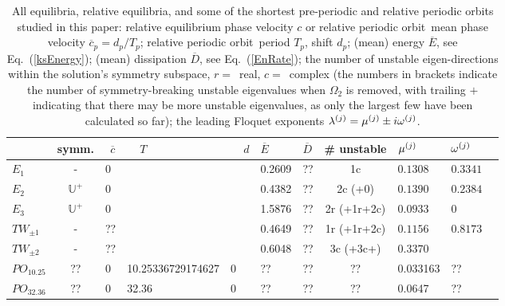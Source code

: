 \documentclass[aip,cha,showpacs,reprint]{revtex4-1} %
\newcommand{\refeq}  [1] {Eq.~(\ref{#1})}                   %
\newcommand{\bbU}{\mathbb{U}}
\newcommand{\eigExp}[1][]{
\ifthenelse{\equal{#1}{}}{\ensuremath{\lambda}}{\ensuremath{\lambda^{(#1)}}}
                        }
\newcommand{\eigRe}[1][]{
\ifthenelse{\equal{#1}{}}{\ensuremath{\mu}}{\ensuremath{\mu^{(#1)}}}
                        }
\newcommand{\eigIm}[1][]{
  \ifthenelse{\equal{#1}{}}{\ensuremath{\omega}}{\ensuremath{\omega^{(#1)}}}
            }
\newcommand{\eqva}{equilib\-ria}
\newcommand{\reqva}{rela\-ti\-ve equilib\-ria}
\newcommand{\rpo}{rela\-ti\-ve periodic orbit}
\newcommand{\period}[1]{{\ensuremath{T_{#1}}}}
\newcommand{\shift}{\ensuremath{d}}
\newcommand{\EQV}[1]{\ensuremath{E_{#1}}}
\newcommand{\REQV}[2]{\ensuremath{TW_{#1#2}}} %
\newcommand{\PO}[1]{\ensuremath{PO_{#1}}}
\newcommand{\velRel}{\ensuremath{c}}    %
\newcommand{\timeAver} [1]{\overline{#1}}
\begin{document}
\begin{table}
   \caption{\label{tab:RPOs}
      All \eqva, \reqva, and some of the shortest pre-periodic and \rpo s
      studied in this paper:
      rela\-ti\-ve equilib\-rium phase velocity $\velRel$ or \rpo\ mean
      phase velocity $\timeAver{\velRel}_p= \shift_p/\period{p}$;
      \rpo\ period $\period{p}$, shift $\shift_p$;
      (mean) energy $\timeAver{E}$, see \refeq{ksEnergy};
      (mean) dissipation $\timeAver{D}$, see \refeq{EnRate};
      the number of unstable eigen-directions within the solution's
      symmetry subspace, $r= $~real, $c= $~complex (the numbers in
      brackets indicate the number of symmetry-breaking unstable
      eigenvalues when $\Omega_2$ is removed, with trailing $+$
      indicating that there may be more unstable eigenvalues, as only the
      largest few have been calculated so far);
      the leading  Floquet exponents
      $\eigExp[j]= \eigRe[j] \pm i\eigIm[j]$.
   }
   \centering
   \begin{tabular}{lclllllclll}
       & symm.           & $~~\timeAver{\velRel}$
                                   & ~~$\period{}$ &  ~~$\shift$
                                   & $\timeAver{E}$~~  & $\timeAver{D}$
                                   & \# unstable
                                   & $\eigRe[j]$ & $\eigIm[j]$
                                   \\
   \hline
   $\EQV{1}$ & - & 0 &&& 0.2609 & ??  & 1c  & $0.1308$& $0.3341$ \\
   $\EQV{2}$ & $\bbU^+$ & 0 &&& 0.4382 & ?? & 2c (+0) & $0.1390$& $0.2384$ \\ %
   $\EQV{3}$ & $\bbU^+$ & 0 &&& 1.5876 & ?? & 2r (+1r+2c) & $0.0933$& 0 \\ %
   $\REQV{\pm}{1}$ & - & ?? &&& 0.4649 & ?? & 1r (+1r+2c) & $0.1156$ & $0.8173$ \\ %
   $\REQV{\pm}{2}$ & - & ?? &&& 0.6048 & ?? & 3c (+3c+) & $0.3370$ &         \\ %
   $\PO{10.25}$  & ?? & $0$ & 10.25336729174627 & 0 & ?? & ?? & ?? & 0.033163 & ?? \\
   $\PO{32.36}$  & ?? & $0$ & 32.36 & 0 & ?? & ?? & ?? & 0.0647 & ?? \\

\end{tabular}
\end{table}
\end{document}
